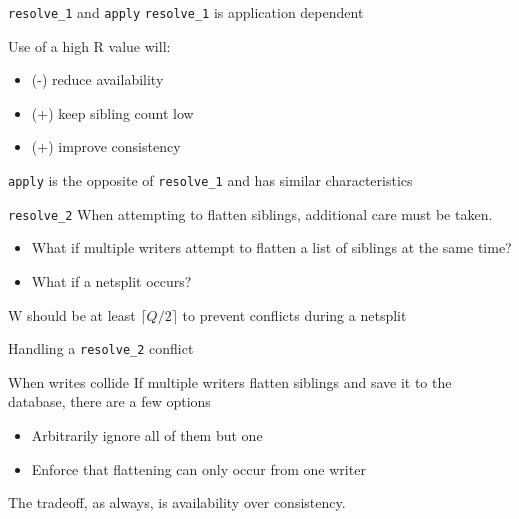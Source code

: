 \documentclass[17pt]{beamer}
\begin{document}
\begin{frame}{\texttt{resolve\_1} and \texttt{apply}}
  \texttt{resolve\_1} is application dependent \pause

  Use of a high R value will:
  \begin{itemize}
  \item (-) reduce availability \pause
  \item (+) keep sibling count low \pause
  \item (+) improve consistency \pause
  \end{itemize}

  \texttt{apply} is the opposite of \texttt{resolve\_1} and has similar characteristics
\end{frame}
\begin{frame}{\texttt{resolve\_2}}
  When attempting to flatten siblings, additional care must be taken. \pause
  \begin{itemize}
    \item What if multiple writers attempt to flatten a list of
      siblings at the same time? \pause
    \item What if a netsplit occurs? \pause
  \end{itemize}

  W should be at least $\lceil Q\slash 2 \rceil$ to prevent conflicts
  during a netsplit
\end{frame}
\begin{frame}{Handling a \texttt{resolve\_2} conflict}
\end{frame}
\begin{frame}{When writes collide}
  If multiple writers flatten siblings and save it to the database,
  there are a few options \pause
  \begin{itemize}
    \item Arbitrarily ignore all of them but one \pause
    \item Enforce that flattening can only occur from one writer \pause
  \end{itemize}

  The tradeoff, as always, is availability over consistency.
\end{frame}
\end{document}
